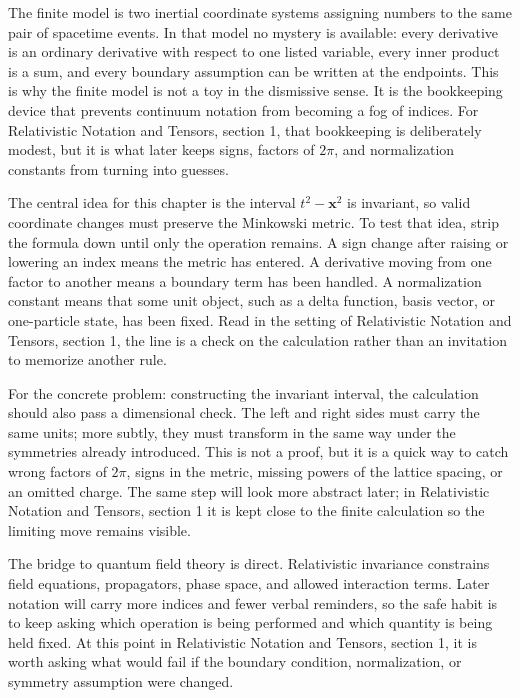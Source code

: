 The finite model is two inertial coordinate systems assigning numbers to the same pair of spacetime events.  In that model no mystery is available: every derivative is an ordinary derivative with respect to one listed variable, every inner product is a sum, and every boundary assumption can be written at the endpoints.  This is why the finite model is not a toy in the dismissive sense.  It is the bookkeeping device that prevents continuum notation from becoming a fog of indices.  For Relativistic Notation and Tensors, section 1, that bookkeeping is deliberately modest, but it is what later keeps signs, factors of \(2\pi\), and normalization constants from turning into guesses.

The central idea for this chapter is the interval \(t^2-\bm x^2\) is invariant, so valid coordinate changes must preserve the Minkowski metric.  To test that idea, strip the formula down until only the operation remains.  A sign change after raising or lowering an index means the metric has entered.  A derivative moving from one factor to another means a boundary term has been handled.  A normalization constant means that some unit object, such as a delta function, basis vector, or one-particle state, has been fixed.  Read in the setting of Relativistic Notation and Tensors, section 1, the line is a check on the calculation rather than an invitation to memorize another rule.

For the concrete problem: constructing the invariant interval, the calculation should also pass a dimensional check.  The left and right sides must carry the same units; more subtly, they must transform in the same way under the symmetries already introduced.  This is not a proof, but it is a quick way to catch wrong factors of \(2\pi\), signs in the metric, missing powers of the lattice spacing, or an omitted charge.  The same step will look more abstract later; in Relativistic Notation and Tensors, section 1 it is kept close to the finite calculation so the limiting move remains visible.

The bridge to quantum field theory is direct.  Relativistic invariance constrains field equations, propagators, phase space, and allowed interaction terms.  Later notation will carry more indices and fewer verbal reminders, so the safe habit is to keep asking which operation is being performed and which quantity is being held fixed.  At this point in Relativistic Notation and Tensors, section 1, it is worth asking what would fail if the boundary condition, normalization, or symmetry assumption were changed.

